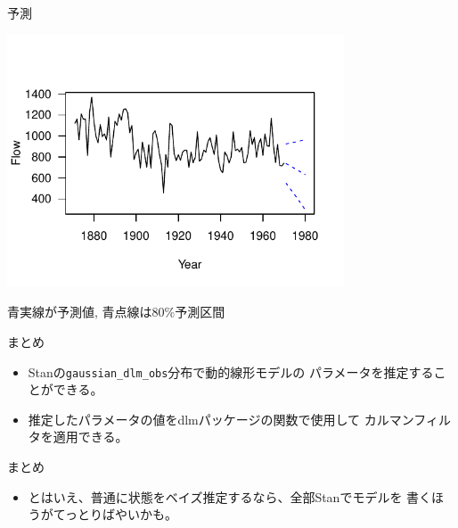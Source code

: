\documentclass[dvipdfmx,12pt]{beamer}
\begin{document}
\begin{frame}{予測}
  \begin{center}
    \includegraphics[width=10cm]{dlm2_predict}
  \end{center}

  青実線が予測値, 青点線は80\%予測区間
\end{frame}

\begin{frame}{まとめ}
  \begin{itemize}
  \item \textsf{Stan}の\texttt{gaussian\_dlm\_obs}分布で動的線形モデルの
    パラメータを推定することができる。
  \item 推定したパラメータの値を\textsf{dlm}パッケージの関数で使用して
    カルマンフィルタを適用できる。
  \end{itemize}
\end{frame}

\begin{frame}{まとめ}
  \begin{itemize}
  \item とはいえ、普通に状態をベイズ推定するなら、全部\textsf{Stanで}モデルを
    書くほうがてっとりばやいかも。

  \end{itemize}
\end{frame}
\end{document}
